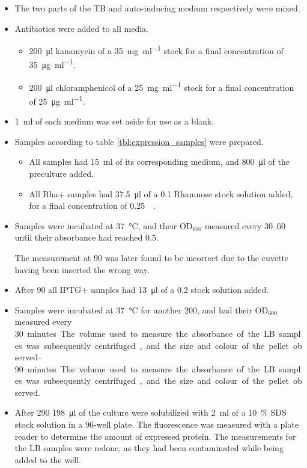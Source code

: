 \begin{itemize}
	\item The two parts of the TB and auto-inducing medium respectively
		were mixed.
	\item Antibiotics were added to all media.
		\begin{itemize}
			\item \SI{200}{\ul} kanamycin of a \SI{35}{\mg\per\ml}
				stock for a final concentration of
				\SI{35}{\ug\per\ml}.
			\item \SI{200}{\ul} chloramphenicol of a
				\SI{25}{\mg\per\ml} stock for a final
				concentration of \SI{25}{\ug\per\ml}.
		\end{itemize}
	\item \SI{1}{\ml} of each medium was set aside for use as a blank.
	\item Samples according to table \ref{tbl:expression_samples} were
		prepared.
		\begin{itemize}
			\item All samples had \SI{15}{\ml} of its corresponding
				medium, and \SI{800}{\ul} of the preculture
				added.
			\item All Rha+ samples had \SI{37.5}{\ul} of a
				\SI{0.1}{\Molar} Rhamnose stock solution added,
				for a final concentration of
				\SI{0.25}{\milli\Molar}.
		\end{itemize}
	\item Samples were incubated at \SI{37}{\celsius}, and their OD$_{600}$
		measured every \SIrange{30}{60}{\min} until their absorbance had
		reached $0.5$.

		The measurement at \SI{90}{\min} was later found to be
		incorrect due to the cuvette having been inserted the wrong
		way.

	\item After \SI{90}{\min} all IPTG+ samples had \SI{13}{\ul} of a
		\SI{0.2}{\Molar} stock solution added.
	\item Samples were incubated at \SI{37}{\celsius} for another
		\SI{200}{\min}, and had their OD$_{600}$ measured every
		\SIrange{30}{90} minutes. The volume used to measure the
		absorbance of the LB samples was subsequently centrifuged, and
		the size and colour of the pellet observed.
	\item After \SI{290}{\min} \SI{198}{\ul} of the culture were
		solubilized with \SI{2}{\ml} of a \SI{10}{\percent} SDS stock
		solution in a 96-well plate. The fluorescence was measured with
		a plate reader to determine the amount of expressed protein. The
		measurements for the LB samples were redone, as they had been
		contaminated while being added to the well.
\end{itemize}

